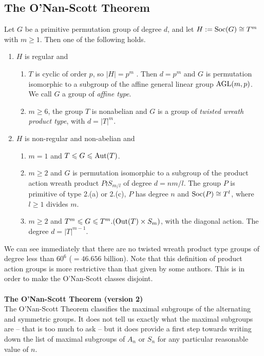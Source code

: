 \subsection{The O'Nan-Scott Theorem}
\label{sec:onan-scott-theorem}

\begin{theorem} 
Let $G$ be a primitive permutation
group of degree $d$, and let $H := \mathrm{Soc}(G) \cong T^m$ with $m \geq 1$. 
Then one of the following holds.
\begin{enumerate}
\item 
$H$ is regular and
  \begin{enumerate}
  \item 
   $T$ is cyclic of order $p$, so $|H| = p^m$ . Then 
$d = p^m$ and $G$ is permutation isomorphic to a subgroup of the affine
general linear group $\mathrm{AGL}(m,p)$. We call $G$ a group of \emph{affine type}.
\item {} $m \geq 6$, the group $T$ is 
  nonabelian and $G$ is a group of \emph{twisted wreath product type}, with
  $d = |T|^m$.
  \end{enumerate}
\item $H$ is non-regular and non-abelian and
  \begin{enumerate}
  \item 
{} $m = 1$ and $T \leqslant G \leqslant \operatorname{Aut}(T)$.
\item {} $m \geq 2$ and $G$ is permutation isomorphic to a
subgroup of the product action wreath product $P \wr S_{m/l}$ of degree
$d = nm/l$. The group $P$ is primitive of type 2.(a) or 2.(c), $P$ has
degree $n$ and $\mathrm{Soc}(P) \cong T^l$, where $l \geq 1$ divides $m$.
\item 
{} $m \geq 2$ and $T^m \leqslant G \leqslant T^m . (\mathrm{Out}(T ) \times S_m)$, with
the diagonal action. The degree $d = |T|^{m-1}$.
  \end{enumerate}
\end{enumerate}
\end{theorem}
We can see immediately that there are no twisted wreath product type
groups of degree less than $60^6$ ($=46.656$ billion).
Note that this definition of product action groups is more restrictive
than that given by some authors. This is in order to make the O’Nan-Scott
classes disjoint.
\\\\
{\bf The O'Nan-Scott Theorem (version 2)}
\\
The O'Nan-Scott Theorem classifies the maximal subgroups
of the alternating and symmetric groups. It does not tell us exactly what the
maximal subgroups are -- that is too much to ask -- but it does provide a first
step towards writing down the list of maximal subgroups of $A_n$ or $S_n$ for any
particular reasonable value of $n$.

